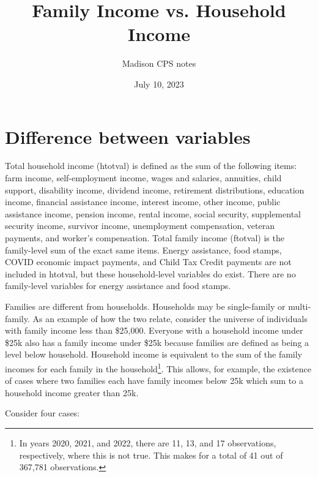 \documentclass{article}
\title{Family Income vs. Household Income}
\author{Madison CPS notes}
\date{July 10, 2023}
\begin{document}
 
	\maketitle
	
	\section{Difference between variables}
	Total household income (htotval) is defined as the sum of the following items: farm income, self-employment income, wages and salaries, annuities, child support, disability income, dividend income, retirement distributions, education income, financial assistance income, interest income, other income, public assistance income, pension income, rental income, social security, supplemental security income, survivor income, unemployment compensation, veteran payments, and worker's compensation. Total family income (ftotval) is the family-level sum of the exact same items. Energy assistance, food stamps, COVID economic impact payments, and Child Tax Credit payments are not included in htotval, but these household-level variables do exist. There are no family-level variables for energy assistance and food stamps. 
	
	Families are different from households. Households may be single-family or multi-family. As an example of how the two relate, consider the universe of individuals with family income less than \$25,000. Everyone with a household income under \$25k also has a family income under \$25k because families are defined as being a level below household. Household income is equivalent to the sum of the family incomes for each family in the household\footnote{In years 2020, 2021, and 2022, there are 11, 13, and 17 observations, respectively, where this is not true. This makes for a total of 41 out of 367,781 observations.}. This allows, for example, the existence of cases where two families each have family incomes below 25k which sum to a household income greater than 25k. 
	
	Consider four cases:
	
\end{document}
